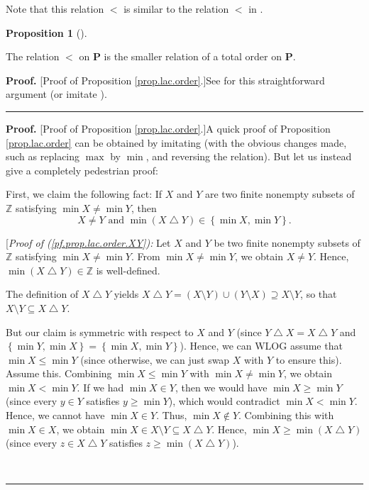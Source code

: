 \documentclass[numbers=enddot,12pt,final,onecolumn,notitlepage]{scrartcl}%
\theoremstyle{definition}
\newtheorem{prop}[theo]{Proposition}
\newenvironment{proposition}[1][]
{\begin{prop}[#1]\begin{leftbar}}
{\end{leftbar}\end{prop}}
\newenvironment{proof}[1][Proof]{\noindent\textbf{#1.} }{\ \rule{0.5em}{0.5em}}
\newenvironment{verlong}{}{}
\newenvironment{vershort}{}{}
\begin{document}
Note that this relation $<$ is similar to the relation $<$ in \cite[Lemma
4.3]{ABN-peaks}.

\begin{proposition}
\label{prop.lac.order}The relation $<$ on $\mathbf{P}$ is the smaller relation
of a total order on $\mathbf{P}$.
\end{proposition}

\begin{vershort}


\begin{proof}
[Proof of Proposition \ref{prop.lac.order}.]See \cite{verlong} for this
straightforward argument (or imitate \cite[proof of Lemma 4.3]{ABN-peaks}).
\end{proof}
\end{vershort}

\begin{verlong}


\begin{proof}
[Proof of Proposition \ref{prop.lac.order}.]A quick proof of Proposition
\ref{prop.lac.order} can be obtained by imitating \cite[proof of Lemma
4.3]{ABN-peaks} (with the obvious changes made, such as replacing $\max$ by
$\min$, and reversing the relation).
But let us instead give a completely pedestrian proof:

First, we claim the following fact: If $X$ and $Y$ are two finite nonempty
subsets of $\mathbb{Z}$ satisfying $\min X\neq\min Y$, then%
\begin{equation}
X\neq Y\text{ and }\min\left(  X\bigtriangleup Y\right)  \in\left\{  \min
X,\min Y\right\}  . \label{pf.prop.lac.order.XY}%
\end{equation}


[\textit{Proof of (\ref{pf.prop.lac.order.XY}):} Let $X$ and $Y$ be two finite
nonempty subsets of $\mathbb{Z}$ satisfying $\min X\neq\min Y$. From $\min
X\neq\min Y$, we obtain $X\neq Y$. Hence, $\min\left(  X\bigtriangleup
Y\right)  \in\mathbb{Z}$ is well-defined.

The definition of $X\bigtriangleup Y$ yields $X\bigtriangleup Y=\left(
X\setminus Y\right)  \cup\left(  Y\setminus X\right)  \supseteq X\setminus Y$,
so that $X\setminus Y\subseteq X\bigtriangleup Y$.

But our claim is symmetric with respect to $X$ and $Y$ (since $Y\bigtriangleup
X=X\bigtriangleup Y$ and $\left\{  \min Y,\min X\right\}  =\left\{  \min
X,\min Y\right\}  $). Hence, we can WLOG assume that $\min X\leq\min Y$ (since
otherwise, we can just swap $X$ with $Y$ to ensure this). Assume this.
Combining $\min X\leq\min Y$ with $\min X\neq\min Y$, we obtain $\min X<\min
Y$. If we had $\min X\in Y$, then we would have $\min X\geq\min Y$ (since
every $y\in Y$ satisfies $y\geq\min Y$), which would contradict $\min X<\min
Y$. Hence, we cannot have $\min X\in Y$. Thus, $\min X\notin Y$. Combining
this with $\min X\in X$, we obtain $\min X\in X\setminus Y\subseteq
X\bigtriangleup Y$. Hence, $\min X\geq\min\left(  X\bigtriangleup Y\right)  $
(since every $z\in X\bigtriangleup Y$ satisfies $z\geq\min\left(
X\bigtriangleup Y\right)  $).


\end{proof}
\end{verlong}
\end{document}
